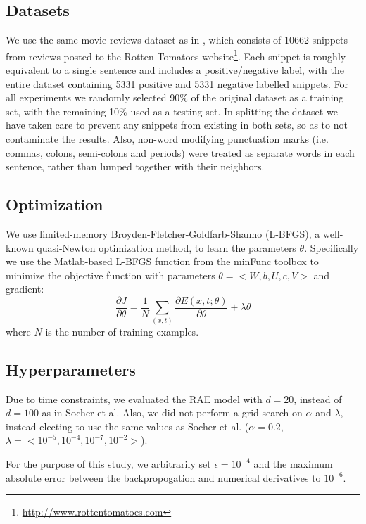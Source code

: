 \documentclass{article}
\begin{document}
\subsection{Datasets}
We use the same movie reviews dataset as in \cite{Socher}, which consists of 10662 snippets from reviews posted to the Rotten Tomatoes website\footnote{\url{http://www.rottentomatoes.com}}. Each snippet is roughly equivalent to a single sentence and includes a positive/negative label, with the entire dataset containing 5331 positive and 5331 negative labelled snippets. For all experiments we randomly selected 90\% of the original dataset as a training set, with the remaining 10\% used as a testing set. In splitting the dataset we have taken care to prevent any snippets from existing in both sets, so as to not contaminate the results. Also, non-word modifying punctuation marks (i.e. commas, colons, semi-colons and periods) were treated as separate words in each sentence, rather than lumped together with their neighbors.


%
%
\subsection{Optimization}
We use limited-memory Broyden-Fletcher-Goldfarb-Shanno (L-BFGS), a well-known quasi-Newton optimization method, to learn the parameters $\theta$. Specifically we use the Matlab-based L-BFGS function from the minFunc toolbox \cite{minFunc} to minimize the objective function with parameters $\theta = < W, b, U, c, V>$ and gradient:
\begin{equation}
    \frac{\partial J}{\partial \theta} = \frac{1}{N} \sum_{(x, t)} \frac{\partial E(x, t; \theta)}{\partial \theta} + \lambda \theta
\end{equation}
where $N$ is the number of training examples.


%
%
\subsection{Hyperparameters}
Due to time constraints, we evaluated the RAE model with $d=20$, instead of $d=100$ as in Socher et al. Also, we did not perform a grid search on $\alpha$ and $\lambda$, instead electing to use the same values as Socher et al. ($\alpha = 0.2$, $\lambda = <10^{-5}, 10^{-4}, 10^{-7}, 10^{-2}>$).

For the purpose of this study, we arbitrarily set $\epsilon = 10^{-4}$ and the maximum absolute error between the backpropogation and numerical derivatives to $10^{-6}$. 
\end{document}
